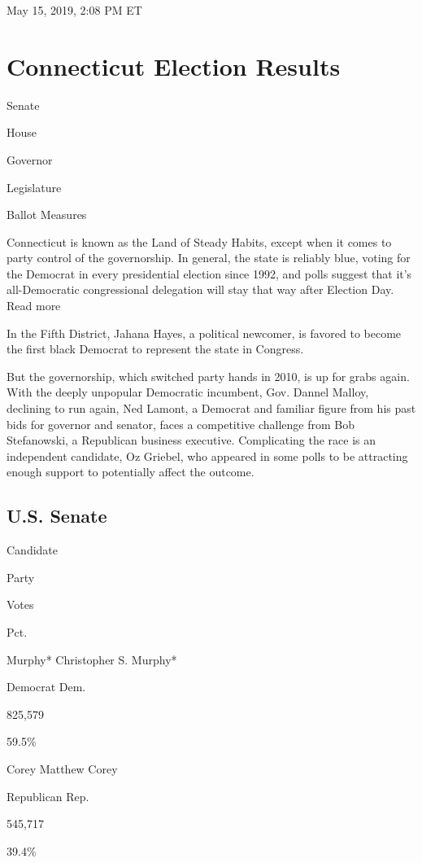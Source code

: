 May 15, 2019, 2:08 PM ET

\hypertarget{connecticut-election-results}{%
\section{Connecticut Election
Results}\label{connecticut-election-results}}

Senate

House

Governor

Legislature

Ballot Measures

Connecticut is known as the Land of Steady Habits, except when it comes
to party control of the governorship. In general, the state is reliably
blue, voting for the Democrat in every presidential election since 1992,
and polls suggest that it's all-Democratic congressional delegation will
stay that way after Election Day. Read more

In the Fifth District, Jahana Hayes, a political newcomer, is favored to
become the first black Democrat to represent the state in Congress.

But the governorship, which switched party hands in 2010, is up for
grabs again. With the deeply unpopular Democratic incumbent, Gov. Dannel
Malloy, declining to run again, Ned Lamont, a Democrat and familiar
figure from his past bids for governor and senator, faces a competitive
challenge from Bob Stefanowski, a Republican business executive.
Complicating the race is an independent candidate, Oz Griebel, who
appeared in some polls to be attracting enough support to potentially
affect the outcome.

\hypertarget{us-senate}{%
\subsection{U.S. Senate}\label{us-senate}}

Candidate

Party

Votes

Pct.

 Murphy* Christopher S. Murphy*

Democrat Dem.

825,579

59.5\%

 Corey Matthew Corey

Republican Rep.

545,717

39.4\%

